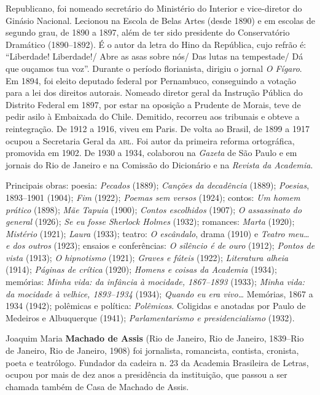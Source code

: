 Republicano, foi nomeado secretário do Ministério do Interior e
vice-diretor do Ginásio Nacional. Lecionou na Escola de Belas Artes
(desde 1890) e em escolas de segundo grau, de 1890 a 1897, além de ter
sido presidente do Conservatório Dramático (1890--1892). É o autor da
letra do Hino da República, cujo refrão é: ``Liberdade! Liberdade!/ Abre
as asas sobre nós/ Das lutas na tempestade/ Dá que ouçamos tua voz''.
Durante o período florianista, dirigiu o jornal \emph{O Fígaro}. Em
1894, foi eleito deputado federal por Pernambuco, conseguindo a votação
para a lei dos direitos autorais. Nomeado diretor geral da Instrução
Pública do Distrito Federal em 1897, por estar na oposição a Prudente de
Morais, teve de pedir asilo à Embaixada do Chile. Demitido, recorreu aos
tribunais e obteve a reintegração. De 1912 a 1916, viveu em Paris. De
volta ao Brasil, de 1899 a 1917 ocupou a Secretaria Geral da \textsc{abl}. Foi
autor da primeira reforma ortográfica, promovida em 1902. De 1930 a
1934, colaborou na \emph{Gazeta} de São Paulo e em jornais do Rio de
Janeiro e na Comissão do Dicionário e na \emph{Revista da Academia}.

Principais obras: poesia: \emph{Pecados} (1889); \emph{Canções da
decadência} (1889); \emph{Poesias}, 1893--1901 (1904); \emph{Fim} (1922);
\emph{Poemas sem versos} (1924); contos: \emph{Um homem prático} (1898);
\emph{Mãe Tapuia} (1900); \emph{Contos escolhidos} (1907); \emph{O
assassinato do general} (1926); \emph{Se eu fosse Sherlock Holmes}
(1932); romances: \emph{Marta} (1920); \emph{Mistério} (1921);
\emph{Laura} (1933); teatro: \emph{O escândalo}, drama (1910) e
\emph{Teatro meu\ldots{} e dos outros} (1923); ensaios e conferências:
\emph{O silêncio é de ouro} (1912); \emph{Pontos de vista} (1913);
\emph{O hipnotismo} (1921); \emph{Graves e fúteis} (1922);
\emph{Literatura alheia} (1914); \emph{Páginas de crítica} (1920);
\emph{Homens e coisas da Academia} (1934); memórias: \emph{Minha vida:
da infância à mocidade, 1867--1893} (1933); \emph{Minha vida: da mocidade
à velhice, 1893--1934} (1934); \emph{Quando eu era vivo\ldots{}}
Memórias, 1867 a 1934 (1942); polêmicas e política: \emph{Polêmicas}.
Coligidas e anotadas por Paulo de Medeiros e Albuquerque (1941);
\emph{Parlamentarismo e presidencialismo} (1932).


Joaquim Maria \textbf{Machado de Assis} (Rio de Janeiro, Rio de Janeiro,
1839--Rio de Janeiro, Rio de Janeiro, 1908) foi jornalista, romancista,
contista, cronista, poeta e teatrólogo. Fundador da cadeira n. 23 da
Academia Brasileira de Letras, ocupou por mais de dez anos a presidência
da instituição, que passou a ser chamada também de Casa de Machado de
Assis.

